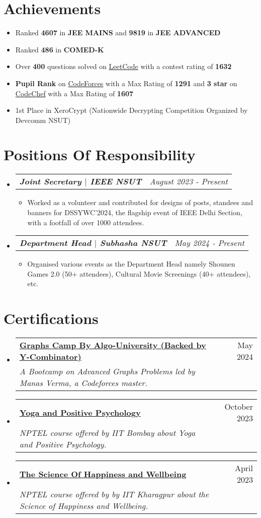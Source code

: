 \documentclass[letterpaper,11pt]{article}
\makeatletter
\newcommand{\resumeItem}[1]{
  \item\small{
    {#1 \vspace{-4pt}}
  }
}
\newcommand{\resumeSubheading}[4]{
  \vspace{-2pt}\item
    \begin{tabular*}{0.97\textwidth}[t]{l@{\extracolsep{\fill}}r}
      \textbf{\small#1} & \small#2 \\
      \textit{\small#3} & \textit{\small #4} \\
    \end{tabular*}\vspace{-7pt}
}
\newcommand{\resumeSubSubheading}[2]{
    \item
    \begin{tabular*}{0.97\textwidth}{l@{\extracolsep{\fill}}r}
      \textit{\small#1} & \textit{\small #2} \\
    \end{tabular*}\vspace{-9pt}
}
\newcommand{\resumeSubItem}[1]{\resumeItem{#1}\vspace{-4.5pt}}
\newcommand{\resumeSubHeadingListStart}{\begin{itemize}[leftmargin=0.15in, label={}]}
\newcommand{\resumeSubHeadingListEnd}{\end{itemize}}
\newcommand{\resumeSubItemListStart}{\begin{itemize}[leftmargin=0.25in]}
\newcommand{\resumeSubItemListEnd}{\end{itemize}\vspace{-6pt}}
\makeatother
\begin{document}
\section{Achievements}
    \resumeSubItemListStart
    \resumeSubItem{Ranked \textbf{4607} in \textbf{JEE MAINS} and  \textbf{9819} in \textbf{JEE ADVANCED}}
    \resumeSubItem{Ranked \textbf{486} in \textbf{COMED-K}}
    \resumeSubItem{Over \textbf{400} questions solved on {\href{https://leetcode.com/u/jaiswarup/} {LeetCode} with a contest rating of \textbf{1632}}}
    \resumeSubItem{\textbf{Pupil Rank} on {\href{https://codeforces.com/profile/JaiSwarup} {CodeForces}} with a Max Rating of \textbf{1291} and \textbf{3 star} on {\href{https://www.codechef.com/users/jswarup} {CodeChef} with a Max Rating of \textbf{1607}}}
    \resumeSubItem{1st Place in XeroCrypt (Nationwide Decrypting Competition Organized by Devcomm NSUT)}
    \resumeSubItemListEnd

\section{Positions Of Responsibility}
  \resumeSubHeadingListStart
  \resumeSubSubheading{\textbf{Joint Secretary $|$ IEEE NSUT}}{August 2023 - Present}
  \begin{itemize}[leftmargin=0.00in, label={}]
      \item \small{Worked as a volunteer and contributed for designs of posts, standees and banners for DSSYWC'2024, the flagship event of IEEE Delhi Section, with a footfall of over 1000 attendees.}\vspace{-8pt}
  \end{itemize}
  \resumeSubSubheading{\textbf{Department Head $|$ Subhasha NSUT}}{May 2024 - Present}
  \begin{itemize}[leftmargin=0.00in, label={}]
      \item \small{Organised various events as the Department Head namely Shounen Games 2.0 (50+ attendees), Cultural Movie Screenings (40+ attendees), etc.} 
  \end{itemize}
  \resumeSubHeadingListEnd

\section{Certifications}
  \resumeSubHeadingListStart
  \resumeSubheading{\href{https://drive.google.com/file/d/1qH5033p0NnD63DeI8x-vEhOdY9jHhWKa/view?usp=sharing}{Graphs Camp By Algo-University (Backed by Y-Combinator)}}{May 2024}{A Bootcamp on Advanced Graphs Problems led by Manas Verma, a Codeforces master.}{}
    \resumeSubheading{\href{https://drive.google.com/file/d/1SIK_fqf9tIvGYe6WjGBMvU5WY8jyrhOW/view?usp=drive_link}{Yoga and Positive Psychology}}{October 2023}{NPTEL course offered by IIT Bombay about Yoga and Positive Psychology.}{}
    \resumeSubheading{\href{https://drive.google.com/file/d/1pLg4yd5fhL1-FMYDrg1IVxhwm8l4tXe8/view?usp=sharing}{The Science Of Happiness and Wellbeing}}{April 2023}{NPTEL course offered by  by IIT Kharagpur about the Science of Happiness and Wellbeing.}{}
  \resumeSubHeadingListEnd

\end{document}

